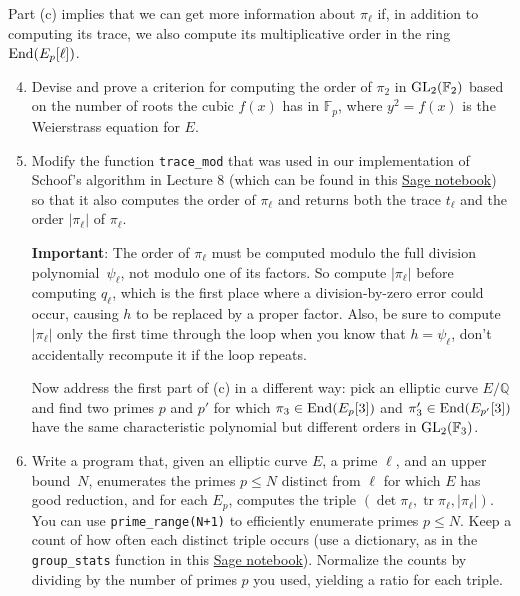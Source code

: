 \documentclass[11pt]{article}
\newcommand{\Fp}{\mathbb{F}_p}
\newcommand{\FF}{\mathbb{F}}
\newcommand{\Q}{\mathbb{Q}}
\newcommand{\End}{{\rm End}}
\newcommand{\GL}{{\rm GL}}
\newcommand{\tr}{\operatorname{tr}}
\theoremstyle{definition}
\begin{document}
\noindent
Part (c) implies that we can get more information about $\pi_\ell$ if, in addition to computing its trace, we also compute its multiplicative order in the ring $\End(E_p[\ell])$.

\begin{enumerate}[{\bf(a)}]
\setcounter{enumi}{3}
\item Devise and prove a criterion for computing the order of $\pi_2$ in $\GL_2(\FF_2)$ based on the number of roots the cubic $f(x)$ has in $\Fp$, where $y^2=f(x)$ is the Weierstrass equation for $E$.

\item
Modify the function \texttt{trace\_mod} that was used in our implementation of Schoof's algorithm in Lecture 8 (which can be found in this \href{https://cocalc.com/share/public_paths/600832aafc89f1098d5415b39eec4fbaa63ccab1}{Sage notebook}) so that it also computes the order of $\pi_\ell$ and returns both the trace $t_\ell$ and the order $|\pi_\ell|$ of $\pi_\ell$.

\textbf{Important}: The order of $\pi_\ell$ must be computed modulo the full division polynomial~$\psi_\ell$, not modulo one of its factors.
So compute $|\pi_\ell|$ before computing $q_\ell$, which is the first place where a division-by-zero error could occur, causing $h$ to be replaced by a proper factor.
Also, be sure to compute $|\pi_\ell|$ only the first time through the loop when you know that $h=\psi_\ell$, don't accidentally recompute it if the loop repeats.

Now address the first part of (c) in a different way: pick an elliptic curve $E/\Q$ and find two primes $p$ and $p'$ for which $\pi_3\in\End(E_p[3])$ and $\pi_3'\in\End(E_{p'}[3])$ have the same characteristic polynomial but different orders in $\GL_2(\FF_3)$.

\item
Write a program that, given an elliptic curve $E$, a prime $\ell$, and an upper bound~$N$, enumerates the primes $p\le N$ distinct from $\ell$ for which $E$ has good reduction,
and for each $E_p$, computes the triple $(\det \pi_\ell, \tr \pi_\ell, |\pi_\ell|)$.
You can use \texttt{prime\_range(N+1)} to efficiently enumerate primes $p\le N$.
Keep a count of how often each distinct triple occurs (use a dictionary, as in the \texttt{group\_stats} function in this \href{https://cocalc.com/share/public_paths/08b5b46513b222cab502f49b0df494307aa2bcd7}{Sage notebook}).
Normalize the counts by dividing by the number of primes $p$ you used, yielding a ratio for each triple.


\end{enumerate}
\end{document}
